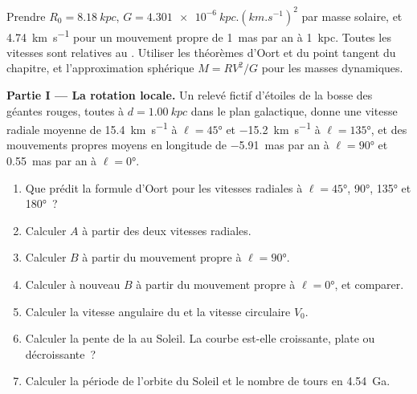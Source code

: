 \begin{problem}
\label{pb:b3:milky-way-galaxies:1}
Prendre $R_0 = \qty{8.18}{kpc}$, $G = \qty{4.301e-6}{kpc.(km.s^{-1})^2}$ par
masse solaire, et \qty{4.74}{km.s^{-1}} pour un mouvement propre de
\qty{1}{mas} par an à \qty{1}{kpc}. Toutes les vitesses sont relatives au
. Utiliser les théorèmes d'Oort et du point tangent du chapitre, et
l'approximation sphérique $M = RV^2/G$ pour les masses dynamiques.

\medskip\noindent\textbf{Partie I --- La rotation locale.} Un
relevé fictif d'étoiles de la bosse des géantes rouges, toutes à $d = \qty{1.00}{kpc}$ dans le
plan galactique, donne une vitesse radiale moyenne de \qty{+15.4}{km.s^{-1}} à
$\ell = \ang{45}$ et \qty{-15.2}{km.s^{-1}} à $\ell = \ang{135}$, et des
mouvements propres moyens en longitude de \qty{-5.91}{mas} par an à
$\ell = \ang{90}$ et \qty{+0.55}{mas} par an à $\ell = \ang{0}$.
\begin{enumerate}
\item Que prédit la formule d'Oort pour les vitesses radiales à
  $\ell = \ang{45}$, \ang{90}, \ang{135} et \ang{180}~?
\item Calculer $A$ à partir des deux vitesses radiales.
\item Calculer $B$ à partir du mouvement propre à $\ell = \ang{90}$.
\item Calculer à nouveau $B$ à partir du mouvement propre à $\ell = \ang{0}$, et
  comparer.
\item Calculer la vitesse angulaire du  et la vitesse
  circulaire $V_0$.
\item Calculer la pente de la  au Soleil. La courbe est-elle
  croissante, plate ou décroissante~?
\item Calculer la période de l'orbite du Soleil et le nombre de tours en
  \qty{4.54}{Ga}.
\end{enumerate}


\end{problem}
